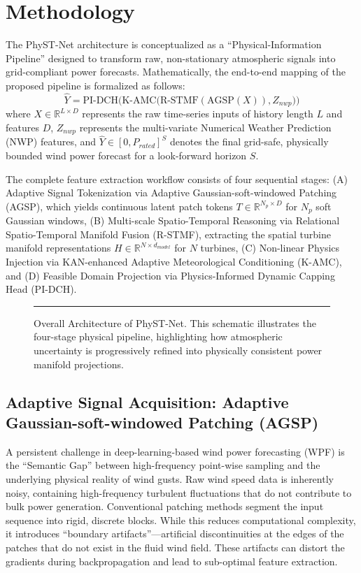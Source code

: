 \section{Methodology}
\label{sec:methodology}
The PhyST-Net architecture is conceptualized as a ``Physical-Information Pipeline'' designed to transform raw, non-stationary atmospheric signals into grid-compliant power forecasts. Mathematically, the end-to-end mapping of the proposed pipeline is formalized as follows:
\begin{equation}
\hat{Y} = \text{PI-DCH} \Big( \text{K-AMC} \big( \text{R-STMF}(\text{AGSP}(X)), Z_{nwp} \big) \Big)
\end{equation}
where $X \in \mathbb{R}^{L \times D}$ represents the raw time-series inputs of history length $L$ and features $D$, $Z_{nwp}$ represents the multi-variate Numerical Weather Prediction (NWP) features, and $\hat{Y} \in [0, P_{rated}]^S$ denotes the final grid-safe, physically bounded wind power forecast for a look-forward horizon $S$. 

The complete feature extraction workflow consists of four sequential stages: (A) Adaptive Signal Tokenization via Adaptive Gaussian-soft-windowed Patching (AGSP), which yields continuous latent patch tokens $T \in \mathbb{R}^{N_p \times D}$ for $N_p$ soft Gaussian windows, (B) Multi-scale Spatio-Temporal Reasoning via Relational Spatio-Temporal Manifold Fusion (R-STMF), extracting the spatial turbine manifold representations $H \in \mathbb{R}^{N \times d_{model}}$ for $N$ turbines, (C) Non-linear Physics Injection via KAN-enhanced Adaptive Meteorological Conditioning (K-AMC), and (D) Feasible Domain Projection via Physics-Informed Dynamic Capping Head (PI-DCH).

\begin{figure}[!t]
\centering
\rule{\textwidth}{0.35\textwidth}
\caption{Overall Architecture of PhyST-Net. This schematic illustrates the four-stage physical pipeline, highlighting how atmospheric uncertainty is progressively refined into physically consistent power manifold projections.}
\label{fig:full_arch}
\end{figure}

\subsection{Adaptive Signal Acquisition: Adaptive Gaussian-soft-windowed Patching (AGSP)}
\label{sec:agsp}
A persistent challenge in deep-learning-based wind power forecasting (WPF) is the ``Semantic Gap'' between high-frequency point-wise sampling and the underlying physical reality of wind gusts. Raw wind speed data is inherently noisy, containing high-frequency turbulent fluctuations that do not contribute to bulk power generation. Conventional patching methods segment the input sequence into rigid, discrete blocks. While this reduces computational complexity, it introduces ``boundary artifacts''---artificial discontinuities at the edges of the patches that do not exist in the fluid wind field. These artifacts can distort the gradients during backpropagation and lead to sub-optimal feature extraction.

